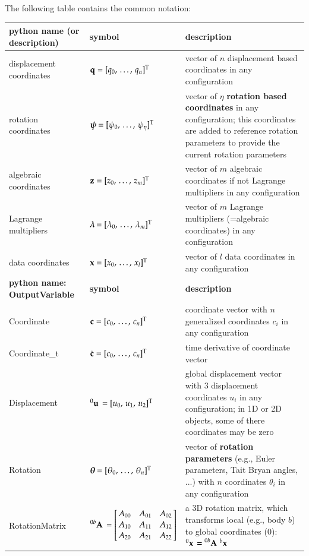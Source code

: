 \documentclass[11pt,a4paper]{book} %
\begin{document}
\noindent The following table contains the common notation: \vspace{-12pt}
\begin{center}
  \footnotesize
  \begin{longtable}{| p{5cm} | p{5cm} | p{6cm} |}
    \hline
    \bf python name (or description) & \bf symbol & \bf description \\ \hline
    displacement coordinates & $\mathbf{q} = [q_0,\, \ldots,\, q_n]^\mathrm{T}$ & vector of $n$ displacement based coordinates in any configuration\\ \hline
    rotation coordinates & $\mbox{\boldmath $\psi$ \unboldmath}\!\! = [\psi_0,\, \ldots,\, \psi_\eta]^\mathrm{T}$ & vector of $\eta$ {\bf rotation based coordinates} in any configuration; this coordinates are added to reference rotation parameters to provide the current rotation parameters\\ \hline
    algebraic coordinates & $\mathbf{z} = [z_0,\, \ldots,\, z_m]^\mathrm{T}$ & vector of $m$ algebraic coordinates if not Lagrange multipliers in any configuration\\ \hline
    Lagrange multipliers & $\mbox{\boldmath $\lambda$ \unboldmath}\!\! = [\lambda_0,\, \ldots,\, \lambda_m]^\mathrm{T}$ & vector of $m$ Lagrange multipliers (=algebraic coordinates) in any configuration\\ \hline
    data coordinates & $\mathbf{x} = [x_0,\, \ldots,\, x_l]^\mathrm{T}$ & vector of $l$ data coordinates in any configuration\\ \hline
    \hline %
		\bf python name: OutputVariable & \bf symbol & \bf description \\ \hline
    Coordinate & $\mathbf{c} = [c_0,\, \ldots,\, c_n]^\mathrm{T}$ & coordinate vector with $n$ generalized coordinates $c_i$ in any configuration\\ \hline
    Coordinate\_t & $\dot {\mathbf{c}} = [c_0,\, \ldots,\, c_n]^\mathrm{T}$ & time derivative of coordinate vector\\ \hline
    Displacement & $\prescript{0}{}{\mathbf{u}}\, = [u_0,\, u_1,\, u_2]^\mathrm{T}$ & global displacement vector with 3 displacement coordinates $u_i$ in any configuration; in 1D or 2D objects, some of there coordinates may be zero\\ \hline
    Rotation & $\mbox{\boldmath $\theta$ \unboldmath}\!\! = [\theta_0,\, \ldots,\, \theta_n]^\mathrm{T}$ & vector of {\bf rotation parameters} (e.g., Euler parameters, Tait Bryan angles, ...) with $n$ coordinates $\theta_i$ in any configuration\\ \hline
    RotationMatrix & $\LU{0b}{\Rot} = \mr{A_{00}}{A_{01}}{A_{02}} {A_{10}}{A_{11}}{A_{12}} {A_{20}}{A_{21}}{A_{22}}$ & a 3D rotation matrix, which transforms local (e.g., body $b$) to global coordinates (0): $\prescript{0}{}{\mathbf{x}}\, = \prescript{0b}{}{\mathbf{A}}\, \prescript{b}{}{\mathbf{x}}\,$\\ \hline

\end{longtable}
\end{center}
\end{document}
